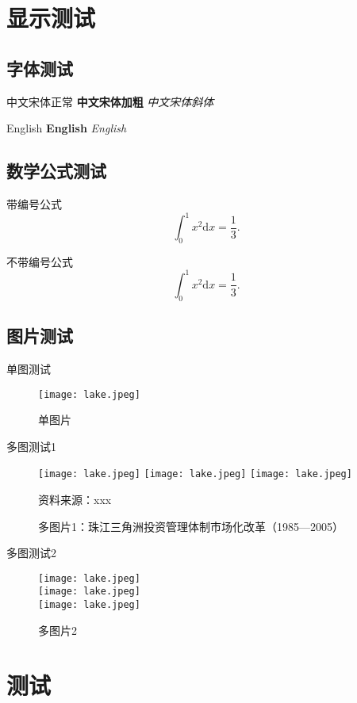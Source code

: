 \documentclass[class = professional, oneside]{gdufe_master_thesis}
\begin{document}
\chapter{显示测试}
\section{字体测试}
中文宋体正常 \textbf{中文宋体加粗} \textit{中文宋体斜体}

English \textbf{English} \textit{English}
\section{数学公式测试}
带编号公式
\begin{equation}
    \int_0^1 x^2 \mathrm{d}x = \frac{1}{3}.
\end{equation}

不带编号公式
\begin{equation*}
    \int_0^1 x^2 \mathrm{d}x = \frac{1}{3}.
\end{equation*}

\section{图片测试}
单图测试
\begin{figure}[h]
    \centering
    \texttt{[image: lake.jpeg]}
    \caption{单图片}
    \label{fig:singlePic}
\end{figure}

多图测试1
\begin{figure}[h]
    \centering
    \texttt{[image: lake.jpeg]}\hfill
    \texttt{[image: lake.jpeg]}\hfill
    \texttt{[image: lake.jpeg]}
    \caption{多图片1：珠江三角洲投资管理体制市场化改革（1985---2005）}
    { \songti 资料来源：xxx}
    \label{fig:MultiPic1}
\end{figure}

多图测试2
\begin{figure}[h]
    \centering
    \texttt{[image: lake.jpeg]}\\
    \texttt{[image: lake.jpeg]}\\
    \texttt{[image: lake.jpeg]}
    \caption{多图片2}
    \label{fig:MultiPic2}
\end{figure}

\chapter{测试}
\end{document}
